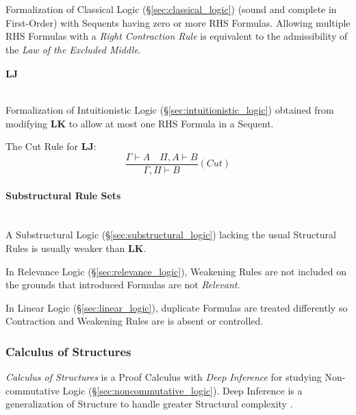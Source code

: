 Formalization of Classical Logic (\S\ref{sec:classical_logic})
(sound and complete in First-Order) with Sequents having zero or more
RHS Formulas. Allowing multiple RHS Formulas with a \emph{Right
  Contraction Rule} is equivalent to the admissibility of the
\emph{Law of the Excluded Middle}.



\paragraph{$\mathbf{LJ}$}\label{sec:lj} \hfill \\

Formalization of Intuitionistic Logic
(\S\ref{sec:intuitionistic_logic}) obtained from modifying
$\mathbf{LK}$ to allow at most one RHS Formula in a Sequent.

The Cut Rule for $\mathbf{LJ}$:
\[
  \frac{
    \Gamma \vdash A \quad \Pi, A \vdash B
  }{
    \Gamma, \Pi \vdash B
  }(Cut)
\]



\paragraph{Substructural Rule Sets}\label{sec:substructural_rule}
\hfill \\

A Substructural Logic (\S\ref{sec:substructural_logic}) lacking the
usual Structural Rules is usually weaker than $\mathbf{LK}$.

In Relevance Logic (\S\ref{sec:relevance_logic}), Weakening Rules
are not included on the grounds that introduced Formulas are not
\emph{Relevant}.

In Linear Logic (\S\ref{sec:linear_logic}), duplicate Formulas are
treated differently so Contraction and Weakening Rules are is absent
or controlled.



\subsubsection{Calculus of Structures}\label{sec:calculus_of_structures}

\emph{Calculus of Structures} is a Proof Calculus with \emph{Deep
  Inference} for studying Non-commutative Logic
(\S\ref{sec:noncommutative_logic}). Deep Inference is a
generalization of Structure to handle greater Structural complexity
\cite{schutte77}.



